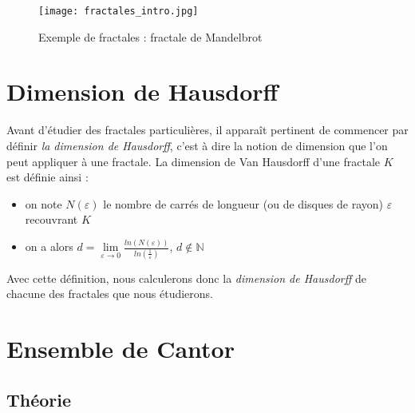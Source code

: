 \documentclass[a4paper,10pt]{report}
\begin{document}
\begin{figure}[H]
\centering
\caption{Exemple de fractales : fractale de Mandelbrot}
\texttt{[image: fractales\_intro.jpg]}
\end{figure}

\section{Dimension de Hausdorff}
Avant d'étudier des fractales particulières, il apparaît pertinent de commencer par définir \textit{la dimension de Hausdorff}, c'est à dire la notion de dimension que l'on peut appliquer à une fractale. La dimension de Van Hausdorff d'une fractale $K$ est définie ainsi :\\
\begin{itemize}
\item on note $N(\varepsilon)$ le nombre de carrés de longueur (ou de disques de rayon) $\varepsilon$ recouvrant $K$
\item on a alors $d=\lim\limits_{\varepsilon \rightarrow 0} \frac{ln(N(\varepsilon))}{ln(\frac{1}{\varepsilon})}$, $d \notin \mathbb{N}$
\end{itemize}
Avec cette définition, nous calculerons donc la \textit{dimension de Hausdorff} de chacune des fractales que nous étudierons.

\section{Ensemble de Cantor}
\subsection{Théorie}
\end{document}
